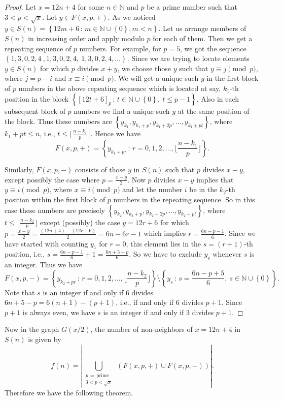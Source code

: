 \documentclass[11pt]{article}
\theoremstyle{definition}
\theoremstyle{remark}
\numberwithin{equation}{section}
\newcommand{\Nat}{\mathbb{N}}
\newcommand{\set}[1]{\left\{#1\right\}}
\newcommand{\Set}[2]{\set{#1\, :\, #2}}
\newcommand{\Mod}[3]{#1\equiv #2 \pmod{#3}}
\begin{document}
\begin{proof} 
Let $x=12n+4$ for some $n\in\Nat$ and $p$ be a prime number such that $3<p<\sqrt{x}$. Let $y\in F(x,p,+)$. As we noticed $y\in S(n)=\Set{12m+6}{m\in\Nat\cup\set{0}, m<n}$. Let us arrange members of $S(n)$ in increasing order and apply modulo $p$ for each of them. Then we get a repeating sequence of $p$ numbers. For example, for $p=5$, we got the sequence $\set{1,3,0,2,4\ ,1,3,0,2,4,\ 1,3,0,2,4,\ldots}$. Since we are trying to locate elements $y\in S(n)$ for which $p$ divides $x+y$, we choose those $y$ such that $\Mod{y}{j}{p}$, where $j=p-i$ and $\Mod{x}{i}{p}$. We will get a unique such $y$ in the first block of $p$ numbers in the above repeating sequence which is located at say, $k_1$-th position in the block $\Set{[12t+6]_p}{t\in\Nat\cup\set{0},\ t\leq p-1}$. Also in each subsequent block of $p$ numbers we find a unique such $y$ at the same position of the block. Thus these numbers are $\set{y_{k_1},y_{k_1+p},y_{k_1+2p},\ldots,y_{k_1+pt}}$, where $k_1+pt\leq n$, i.e., $t\leq \lfloor \frac{n-k_1}{p}\rfloor$. Hence we have
$$F(x,p,+)=\Set{y_{k_1+pr}}{r=0,1,2,\ldots,\lfloor \frac{n-k_1}{p}\rfloor}.$$

\noindent
Similarly, $F(x,p,-)$ consists of those $y$ in $S(n)$ such that $p$ divides $x-y$, except possibly the case where $p=\frac{x-y}{2}$. Now $p$ divides $x-y$ implies that $\Mod{y}{i}{p}$, where $\Mod{x}{i}{p}$ and let the number $i$ be in the $k_2$-th position within the first block of $p$ numbers in the repeating sequence. So in this case these numbers are precisely $\set{y_{k_2},y_{k_2+p},y_{k_2+2p},\ldots,y_{k_2+pt}}$, where $t\leq \lfloor \frac{n-k_2}{p}\rfloor$ except (possibly) the case $y=12r+6$ for which $p=\frac{x-y}{2}=\frac{(12n+4)-(12r+6)}{2}=6n-6r-1$ which implies $r=\frac{6n-p-1}{6}$. Since we have started with counting $y_1$ for $r=0$, this element lies in the $s=(r+1)$-th position, i.e., $s=\frac{6n-p-1}{6}+1=\frac{6n+5-p}{6}$. So we have to exclude $y_s$ whenever $s$ is an integer. Thus we have
$$F(x,p,-)=\Set{y_{k_2+pr}}{r=0,1,2,\ldots,\lfloor \frac{n-k_2}{p}\rfloor} \setminus\Set{y_s}{s=\frac{6n-p+5}{6},\ s\in\Nat\cup\set{0}}.$$
Note that $s$ is an integer if and only if $6$ divides $6n+5-p=6(n+1)-(p+1)$, i.e., if and only if $6$ divides $p+1$. Since $p+1$ is always even, we have $s$ is an integer if and only if $3$ divides $p+1$. 
\end{proof}

\noindent
Now in the graph $G(x/2)$, the number of non-neighbors of $x=12n+4$ in $S(n)$ is given by
\begin{equation}\label{eqfn}
f(n)=|\bigcup\limits_{\substack{p\, =\, \text{prime}\\ 3<p<\sqrt{x}}} \ \left(F(x,p,+)\cup F(x,p,-)\right)|.
\end{equation}
Therefore we have the following theorem.
\end{document}

